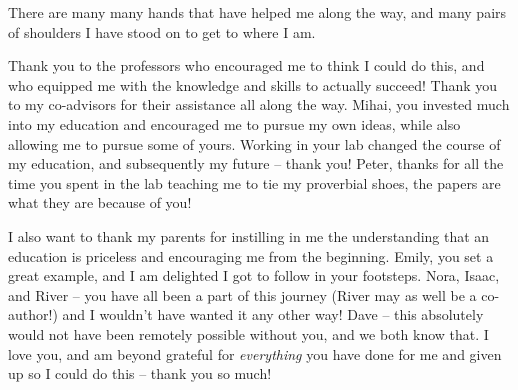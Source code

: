 There are many many hands that have helped me along the way, and many pairs of shoulders I have stood on to get to where I am.  

Thank you to the professors who encouraged me to think I could do this, and who equipped me with the knowledge and skills to actually succeed!  Thank you to my co-advisors for their assistance all along the way.  Mihai, you invested much into my education and encouraged me to pursue my own ideas, while also allowing me to pursue some of yours. Working in your lab changed the course of my education, and subsequently my future -- thank you!  Peter, thanks for all the time you spent in the lab teaching me to tie my proverbial shoes, the papers are what they are because of you!  

I also want to thank my parents for instilling in me the understanding that an education is priceless and encouraging me from the beginning. Emily, you set a great example, and I am delighted I got to follow in your footsteps.  Nora, Isaac, and River -- you have all been a part of this journey (River may as well be a co-author!) and I wouldn't have wanted it any other way!  Dave -- this absolutely would not have been remotely possible without you, and we both know that.  I love you, and am beyond grateful for \textit{everything} you have done for me and given up so I could do this -- thank you so much! 
